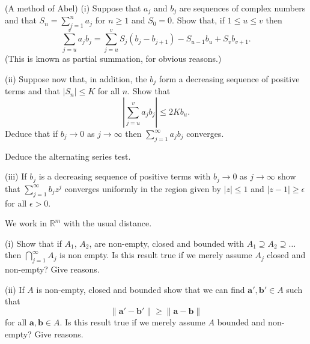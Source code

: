 \begin{question} (A method of Abel) (i) Suppose that
$a_{j}$ and $b_{j}$ are sequences of complex numbers
and that $S_{n}=\sum_{j=1}^{n}a_{j}$ for $n\geq 1$
and $S_{0}=0$. Show that, if $1\leq u\leq v$ then
\[\sum_{j=u}^{v}a_{j}b_{j}=\sum_{j=u}^{v}S_{j}(b_{j}-b_{j+1})
-S_{u-1}b_{u}+S_{v}b_{v+1}.\]
(This is known as partial summation, for obvious reasons.)

(ii) Suppose now that, in addition, the $b_{j}$
form a decreasing sequence of positive terms
and that $|S_{n}|\leq K$ for all $n$.
Show that
\[\left|\sum_{j=u}^{v}a_{j}b_{j}\right|
\leq 2Kb_{u}.\]
Deduce that if $b_{j}\rightarrow 0$ as $j\rightarrow\infty$
then $\sum_{j=1}^{\infty}a_{j}b_{j}$ converges.

Deduce the alternating series test.

(iii) If $b_{j}$ is a decreasing sequence of positive terms
with $b_{j}\rightarrow 0$ as $j\rightarrow\infty$ show
that  $\sum_{j=1}^{\infty}b_{j}z^{j}$ converges uniformly
in the region given by $|z|\leq 1$ and $|z-1|\geq \epsilon$
for all $\epsilon>0$.


\end{question}
\begin{question}\label{4.9}
We work in ${\mathbb R}^{m}$ with the usual distance.

(i) Show that if $A_{1}$, $A_{2}$, are non-empty,
closed and bounded with $A_{1}\supseteq A_{2}\supseteq\dots$
then $\bigcap_{j=1}^{\infty}A_{j}$ is non empty.
Is this result true if we merely assume $A_{j}$ closed and non-empty?
Give reasons.

(ii) If $A$ is non-empty, closed and bounded show that we can find
${\mathbf a}',{\mathbf b}'\in A$ such that
\[\|{\mathbf a}'-{\mathbf b}'\|\geq\|{\mathbf a}-{\mathbf b}\|\]
for all ${\mathbf a},{\mathbf b}\in A$.
Is this result true if we merely assume $A$ bounded and non-empty?
Give reasons.


\end{question}
